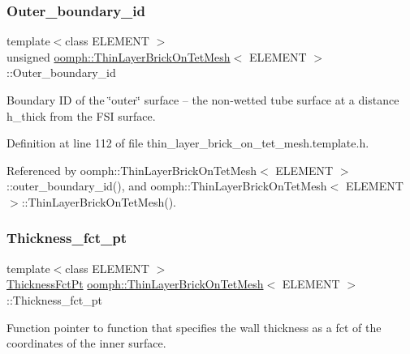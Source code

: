 \subsubsection{\texorpdfstring{Outer\+\_\+boundary\+\_\+id}{Outer\_boundary\_id}}
{\footnotesize\ttfamily template$<$class E\+L\+E\+M\+E\+NT $>$ \\
unsigned \hyperlink{classoomph_1_1ThinLayerBrickOnTetMesh}{oomph\+::\+Thin\+Layer\+Brick\+On\+Tet\+Mesh}$<$ E\+L\+E\+M\+E\+NT $>$\+::Outer\+\_\+boundary\+\_\+id\hspace{0.3cm}{\ttfamily [private]}}



Boundary ID of the \char`\"{}outer\char`\"{} surface -- the non-\/wetted tube surface at a distance h\+\_\+thick from the F\+SI surface. 



Definition at line 112 of file thin\+\_\+layer\+\_\+brick\+\_\+on\+\_\+tet\+\_\+mesh.\+template.\+h.



Referenced by oomph\+::\+Thin\+Layer\+Brick\+On\+Tet\+Mesh$<$ E\+L\+E\+M\+E\+N\+T $>$\+::outer\+\_\+boundary\+\_\+id(), and oomph\+::\+Thin\+Layer\+Brick\+On\+Tet\+Mesh$<$ E\+L\+E\+M\+E\+N\+T $>$\+::\+Thin\+Layer\+Brick\+On\+Tet\+Mesh().

\mbox{\label{classoomph_1_1ThinLayerBrickOnTetMesh_a51d5c130c6b267fc8996e02d1172c81d}} 
\subsubsection{\texorpdfstring{Thickness\+\_\+fct\+\_\+pt}{Thickness\_fct\_pt}}
{\footnotesize\ttfamily template$<$class E\+L\+E\+M\+E\+NT $>$ \\
\hyperlink{classoomph_1_1ThinLayerBrickOnTetMesh_aed34f7d1e9a5c6b5f3e220cb5bdf4550}{Thickness\+Fct\+Pt} \hyperlink{classoomph_1_1ThinLayerBrickOnTetMesh}{oomph\+::\+Thin\+Layer\+Brick\+On\+Tet\+Mesh}$<$ E\+L\+E\+M\+E\+NT $>$\+::Thickness\+\_\+fct\+\_\+pt\hspace{0.3cm}{\ttfamily [private]}}



Function pointer to function that specifies the wall thickness as a fct of the coordinates of the inner surface. 



